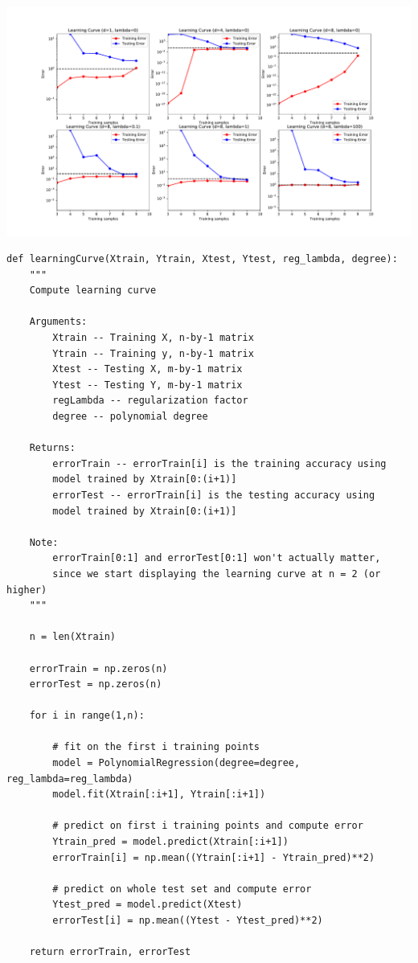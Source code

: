 \documentclass{article}
\begin{document}
\vspace{-0.1cm}
\hspace{-3.4cm}
\includegraphics[width=1.4\textwidth]{A5.pdf}

\begin{verbatim}
def learningCurve(Xtrain, Ytrain, Xtest, Ytest, reg_lambda, degree):
    """
    Compute learning curve

    Arguments:
        Xtrain -- Training X, n-by-1 matrix
        Ytrain -- Training y, n-by-1 matrix
        Xtest -- Testing X, m-by-1 matrix
        Ytest -- Testing Y, m-by-1 matrix
        regLambda -- regularization factor
        degree -- polynomial degree

    Returns:
        errorTrain -- errorTrain[i] is the training accuracy using
        model trained by Xtrain[0:(i+1)]
        errorTest -- errorTrain[i] is the testing accuracy using
        model trained by Xtrain[0:(i+1)]

    Note:
        errorTrain[0:1] and errorTest[0:1] won't actually matter, 
        since we start displaying the learning curve at n = 2 (or higher)
    """

    n = len(Xtrain)

    errorTrain = np.zeros(n)
    errorTest = np.zeros(n)

    for i in range(1,n):

        # fit on the first i training points
        model = PolynomialRegression(degree=degree, reg_lambda=reg_lambda)
        model.fit(Xtrain[:i+1], Ytrain[:i+1])

        # predict on first i training points and compute error
        Ytrain_pred = model.predict(Xtrain[:i+1])
        errorTrain[i] = np.mean((Ytrain[:i+1] - Ytrain_pred)**2)

        # predict on whole test set and compute error
        Ytest_pred = model.predict(Xtest)
        errorTest[i] = np.mean((Ytest - Ytest_pred)**2)

    return errorTrain, errorTest
\end{verbatim}
\end{document}

